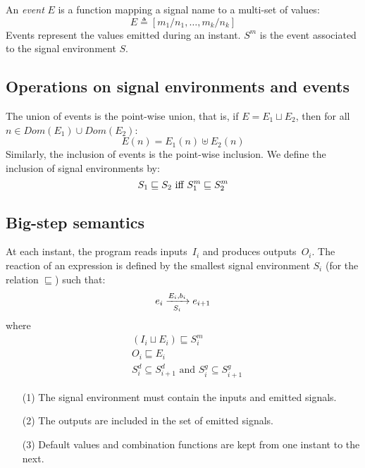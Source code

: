 \documentclass[9pt]{sigplanconf}
\newcommand{\deq}{\triangleq}
\begin{document}
An \emph{event} $E$ is a function mapping a signal name to a multi-set of values:
\[ E \deq [ m_1/n_1, \dots, m_k/n_k] \]
Events represent the values emitted during an instant. $S^m$ is the event associated to the signal environment $S$.

\subsection*{Operations on signal environments and events}

The union of events is the point-wise union, that is, if $E = E_1 \sqcup E_2$, then for all  $n \in \mathit{Dom}(E_1) \cup \mathit{Dom}(E_2)$: 
\[ E(n) = E_1(n) \uplus E_2(n) \]
Similarly, the inclusion of events is the point-wise inclusion. We define the inclusion of signal environments by:
\[ S_1 \sqsubseteq S_2 \text{ iff } S^m_1 \sqsubseteq S^m_2 \\ \]


\subsection{Big-step semantics}

At each instant, the program reads inputs~$I_i$ and produces outputs~$O_i$. The reaction of an expression is defined by the smallest signal environment $S_i$ (for the relation $\sqsubseteq$) such that:
\[ \bigstep{N}{e_i}{e_{i+1}}{E_i}{b_i}{S_i} \]
where
\begin{align}
& (I_i \sqcup E_i ) \sqsubseteq S_i^m \\
& O_i \sqsubseteq E_i \\
& S^d_i \subseteq S^d_{i+1} \text{ and } S^g_i \subseteq S^g_{i+1} 
\end{align}
\begin{itemize}
\item[(1)] The signal environment must contain the inputs and emitted signals.
\item[(2)] The outputs are included in the set of emitted signals.
\item[(3)] Default values and combination functions are kept from one instant to the next.
\end{itemize}
\end{document}
